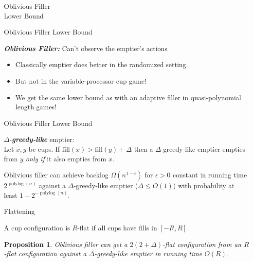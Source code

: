 \documentclass[xcolor=x11names, svgnames, rgb]{beamer}
\newcommand{\polylog}{\operatorname{polylog}}
\newcommand{\defn}[1]       {{\textit{\textbf{\boldmath #1}}}}
\newtheorem{proposition}{Proposition}
\begin{document}
\begin{frame}[c]{}
  \begin{center}
    \Huge Oblivious Filler \\
    Lower Bound
  \end{center}
\end{frame}

\begin{frame}[t]{Oblivious Filler Lower Bound}
  \begin{definition}
    \defn{Oblivious Filler:}
    Can't observe the emptier's actions 
  \end{definition}

  \begin{itemize}
    \item Classically emptier does better in the randomized setting.
    \item But not in the variable-processor cup game!
    \item We get the same lower bound as with an adaptive filler in quasi-polynomial length games!
  \end{itemize}

\end{frame}

\begin{frame}[t]{Oblivious Filler Lower Bound}
  \begin{definition}
    $\Delta$-\defn{greedy-like} emptier: \\
    Let $x,y$ be cups. If $\text{fill}(x) > \text{fill}(y) + \Delta$ then a
    $\Delta$-greedy-like emptier empties from $y$ \emph{only if} it also
    empties from $x$.
  \end{definition}

  \vspace{0.5cm}
  Oblivious filler can achieve backlog $\Omega(n^{1-\epsilon})$ for $\epsilon
  >0 $ constant in running time $2^{\polylog(n)}$ against a
  $\Delta$-greedy-like emptier ($\Delta \le O(1)$) with probability at least
  $1-2^{-\polylog(n)}$.

\end{frame}

\begin{frame}[t]{Flattening}
 \begin{definition}
   A cup configuration is $R$-flat if all cups have fills in $[-R, R]$.
 \end{definition} 
 \vspace{1cm}
 \begin{proposition} 
   Oblivious filler can get a $2(2+\Delta)$-flat configuration from an
   $R$-flat configuration against a $\Delta$-greedy-like emptier in running
   time $O(R)$.
 \end{proposition}
\end{frame}
\end{document}

